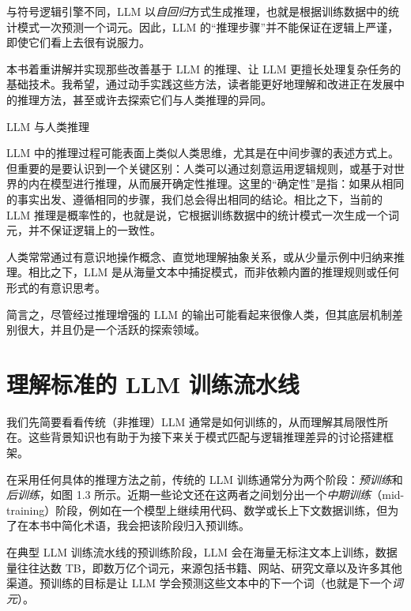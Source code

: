 与符号逻辑引擎不同，LLM 以\emph{自回归}方式生成推理，也就是根据训练数据中的统计模式一次预测一个词元。因此，LLM 的“推理步骤”并不能保证在逻辑上严谨，即使它们看上去很有说服力。

本书着重讲解并实现那些改善基于 LLM 的推理、让 LLM 更擅长处理复杂任务的基础技术。我希望，通过动手实践这些方法，读者能更好地理解和改进正在发展中的推理方法，甚至或许去探索它们与人类推理的异同。

\begin{mySidebar}{LLM 与人类推理}

LLM 中的推理过程可能表面上类似人类思维，尤其是在中间步骤的表述方式上。但重要的是要认识到一个关键区别：人类可以通过刻意运用逻辑规则，或基于对世界的内在模型进行推理，从而展开确定性推理。这里的“确定性”是指：如果从相同的事实出发、遵循相同的步骤，我们总会得出相同的结论。相比之下，当前的 LLM 推理是概率性的，也就是说，它根据训练数据中的统计模式一次生成一个词元，并不保证逻辑上的一致性。

人类常常通过有意识地操作概念、直觉地理解抽象关系，或从少量示例中归纳来推理。相比之下，LLM 是从海量文本中捕捉模式，而非依赖内置的推理规则或任何形式的有意识思考。

简言之，尽管经过推理增强的 LLM 的输出可能看起来很像人类，但其底层机制差别很大，并且仍是一个活跃的探索领域。

\end{mySidebar}

\section{理解标准的 LLM 训练流水线}

我们先简要看看传统（非推理）LLM 通常是如何训练的，从而理解其局限性所在。这些背景知识也有助于为接下来关于模式匹配与逻辑推理差异的讨论搭建框架。

在采用任何具体的推理方法之前，传统的 LLM 训练通常分为两个阶段：\emph{预训练}和\emph{后训练}，如图 1.3 所示。近期一些论文还在这两者之间划分出一个\emph{中期训练}（mid-training）阶段，例如在一个模型上继续用代码、数学或长上下文数据训练，但为了在本书中简化术语，我会把该阶段归入预训练。


在典型 LLM 训练流水线的预训练阶段，LLM 会在海量无标注文本上训练，数据量往往达数 TB，即数万亿个词元，来源包括书籍、网站、研究文章以及许多其他渠道。预训练的目标是让 LLM 学会预测这些文本中的下一个词（也就是下一个\emph{词元}）。

